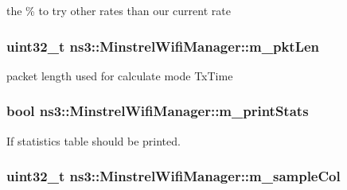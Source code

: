 the \% to try other rates than our current rate 

\subsubsection[{\texorpdfstring{m\+\_\+pkt\+Len}{m_pktLen}}]{\setlength{\rightskip}{0pt plus 5cm}uint32\+\_\+t ns3\+::\+Minstrel\+Wifi\+Manager\+::m\+\_\+pkt\+Len\hspace{0.3cm}{\ttfamily [private]}}\hypertarget{classns3_1_1MinstrelWifiManager_a425848a251a8fc4db5d9acb2d8c21538}{}\label{classns3_1_1MinstrelWifiManager_a425848a251a8fc4db5d9acb2d8c21538}


packet length used for calculate mode Tx\+Time 

\subsubsection[{\texorpdfstring{m\+\_\+print\+Stats}{m_printStats}}]{\setlength{\rightskip}{0pt plus 5cm}bool ns3\+::\+Minstrel\+Wifi\+Manager\+::m\+\_\+print\+Stats\hspace{0.3cm}{\ttfamily [private]}}\hypertarget{classns3_1_1MinstrelWifiManager_a81802688a5cc3f6136f54264f2e3bcd5}{}\label{classns3_1_1MinstrelWifiManager_a81802688a5cc3f6136f54264f2e3bcd5}


If statistics table should be printed. 

\subsubsection[{\texorpdfstring{m\+\_\+sample\+Col}{m_sampleCol}}]{\setlength{\rightskip}{0pt plus 5cm}uint32\+\_\+t ns3\+::\+Minstrel\+Wifi\+Manager\+::m\+\_\+sample\+Col\hspace{0.3cm}{\ttfamily [private]}}\hypertarget{classns3_1_1MinstrelWifiManager_a2112a731d89b8cd936a7f659aa678a15}{}\label{classns3_1_1MinstrelWifiManager_a2112a731d89b8cd936a7f659aa678a15}


